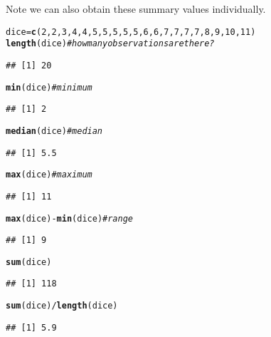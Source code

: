 \documentclass[12pt]{article}\usepackage[]{graphicx}\usepackage[]{color}
\makeatletter
\newcommand{\hlnum}[1]{\textcolor[rgb]{0.686,0.059,0.569}{#1}}%
\newcommand{\hlcom}[1]{\textcolor[rgb]{0.678,0.584,0.686}{\textit{#1}}}%
\newcommand{\hlopt}[1]{\textcolor[rgb]{0,0,0}{#1}}%
\newcommand{\hlstd}[1]{\textcolor[rgb]{0.345,0.345,0.345}{#1}}%
\newcommand{\hlkwb}[1]{\textcolor[rgb]{0.69,0.353,0.396}{#1}}%
\newcommand{\hlkwd}[1]{\textcolor[rgb]{0.737,0.353,0.396}{\textbf{#1}}}%
\newenvironment{kframe}{%
 \def\at@end@of@kframe{}%
 \ifinner\ifhmode%
  \def\at@end@of@kframe{\end{minipage}}%
  \begin{minipage}{\columnwidth}%
 \fi\fi%
 \def\FrameCommand##1{\hskip\@totalleftmargin \hskip-\fboxsep
 \colorbox{shadecolor}{##1}\hskip-\fboxsep
     \hskip-\linewidth \hskip-\@totalleftmargin \hskip\columnwidth}%
 \MakeFramed {\advance\hsize-\width
   \@totalleftmargin\z@ \linewidth\hsize
   \@setminipage}}%
 {\par\unskip\endMakeFramed%
 \at@end@of@kframe}
\newenvironment{knitrout}{}{} %
\makeatother
\begin{document}
Note we can also obtain these summary values individually.
\begin{knitrout}
\color{fgcolor}\begin{kframe}
\begin{alltt}
\hlstd{dice} \hlkwb{=} \hlkwd{c}\hlstd{(}\hlnum{2}\hlstd{,} \hlnum{2}\hlstd{,} \hlnum{3}\hlstd{,} \hlnum{4}\hlstd{,} \hlnum{4}\hlstd{,} \hlnum{5}\hlstd{,} \hlnum{5}\hlstd{,} \hlnum{5}\hlstd{,} \hlnum{5}\hlstd{,} \hlnum{5}\hlstd{,} \hlnum{6}\hlstd{,} \hlnum{6}\hlstd{,} \hlnum{7}\hlstd{,} \hlnum{7}\hlstd{,} \hlnum{7}\hlstd{,} \hlnum{7}\hlstd{,} \hlnum{8}\hlstd{,} \hlnum{9}\hlstd{,} \hlnum{10}\hlstd{,} \hlnum{11}\hlstd{)}
\hlkwd{length}\hlstd{(dice)}  \hlcom{#how many observations are there?}
\end{alltt}
\begin{verbatim}
## [1] 20
\end{verbatim}
\begin{alltt}
\hlkwd{min}\hlstd{(dice)}  \hlcom{#minimum}
\end{alltt}
\begin{verbatim}
## [1] 2
\end{verbatim}
\begin{alltt}
\hlkwd{median}\hlstd{(dice)}  \hlcom{#median}
\end{alltt}
\begin{verbatim}
## [1] 5.5
\end{verbatim}
\begin{alltt}
\hlkwd{max}\hlstd{(dice)}  \hlcom{#maximum}
\end{alltt}
\begin{verbatim}
## [1] 11
\end{verbatim}
\begin{alltt}
\hlkwd{max}\hlstd{(dice)} \hlopt{-} \hlkwd{min}\hlstd{(dice)}  \hlcom{#range}
\end{alltt}
\begin{verbatim}
## [1] 9
\end{verbatim}
\begin{alltt}
\hlkwd{sum}\hlstd{(dice)}
\end{alltt}
\begin{verbatim}
## [1] 118
\end{verbatim}
\begin{alltt}
\hlkwd{sum}\hlstd{(dice)}\hlopt{/}\hlkwd{length}\hlstd{(dice)}
\end{alltt}
\begin{verbatim}
## [1] 5.9
\end{verbatim}

\end{kframe}
\end{knitrout}
\end{document}
